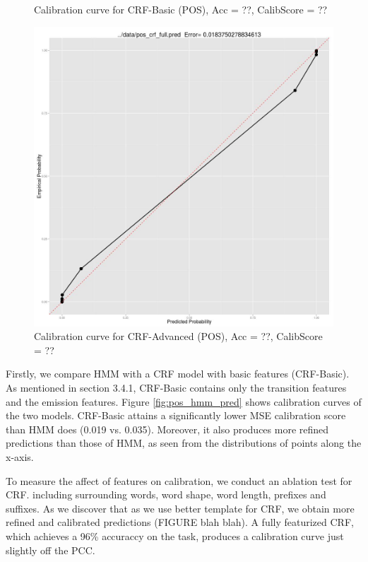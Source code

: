 \begin{figure}[t]
  \caption{Calibration curve for CRF-Basic (POS), Acc = ??, CalibScore = ??}
  \label{fig:pos_crf_pred}
\endminipage\hfill
{}
  \includegraphics[width=\linewidth, valign=t]{pos_crf_advanced_pred.jpg}
  \caption{Calibration curve for CRF-Advanced (POS), Acc = ??, CalibScore = ??}
  \label{fig:pos_crf_advanced_pred}  
\endminipage
\end{figure}

Firstly, we compare HMM with a CRF model with basic features (CRF-Basic). As mentioned in section 3.4.1, CRF-Basic contains only the transition features and the emission features. Figure \ref{fig:pos_hmm_pred} shows calibration curves of the two models. CRF-Basic attains a significantly lower MSE calibration score than HMM does (0.019 vs. 0.035). Moreover, it also produces more refined predictions than those of HMM, as seen from the distributions of points along the x-axis.

To measure the affect of features on calibration, we conduct an ablation test for CRF. including surrounding words, word shape, word length, prefixes and suffixes. As we discover that as we use better template for CRF, we obtain more refined and calibrated predictions (FIGURE blah blah). A fully featurized CRF, which achieves a 96\% accuraccy on the task, produces a calibration curve just slightly off the PCC. 

